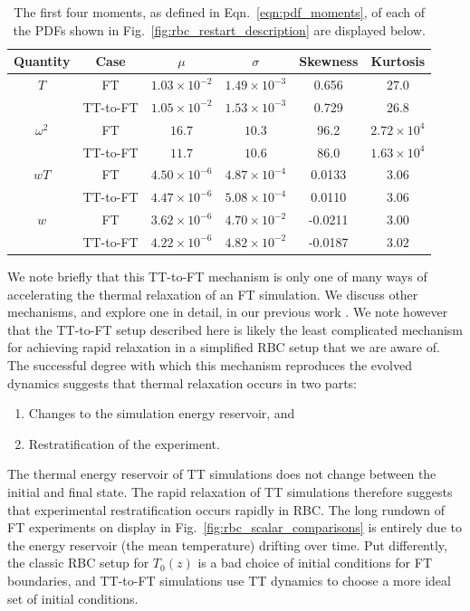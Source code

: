 \begin{table}[b!]
\vspace{-0.5cm}
\caption[PDF moments for FT and TT-to-FT comparisons]{ 
	The first four moments, as defined in Eqn.~\ref{eqn:pdf_moments}, of each of the PDFs shown in Fig.~\ref{fig:rbc_restart_description} are displayed below.
}
\vspace{-0.25cm}
\setlength{\tabcolsep}{12pt}
\label{table:pdf_values}
\begin{center}
\begin{tabular}{c c c c c c}
\hline																	
Quantity &	Case	&	$\mu$	&	$\sigma$	&	Skewness	&	Kurtosis \\
\hline
$T$				&	FT			&		$1.03 \times 10^{-2}$	&	$1.49 \times 10^{-3}$	&	0.656		&	27.0 \\
				&	TT-to-FT	&		$1.05 \times 10^{-2}$	&	$1.53 \times 10^{-3}$	&	0.729		&	26.8 \\
\hline
$\omega^2$		&	FT			&		$16.7$					&	$10.3$					&	96.2		&	$2.72 \times 10^4$ \\
				&	TT-to-FT	&		$11.7$					&	$10.6$					&	86.0		&	$1.63 \times 10^4$ \\
\hline
$wT$			&	FT			&		$4.50 \times 10^{-6}$	&	$4.87 \times 10^{-4}$	&	0.0133	&	$3.06$ \\
				&	TT-to-FT	&		$4.47 \times 10^{-6}$	&	$5.08 \times 10^{-4}$	&	0.0110	&	$3.06$ \\
\hline
$w$				&	FT			&		$3.62 \times 10^{-6}$	&	$4.70 \times 10^{-2}$	&	-0.0211	&	$3.00$ \\
				&	TT-to-FT	&		$4.22 \times 10^{-6}$	&	$4.82 \times 10^{-2}$	&	-0.0187	&	$3.02$ \\
\hline																	
\end{tabular}
\end{center}
\end{table}

We note briefly that this TT-to-FT mechanism is only one of many ways of accelerating the thermal relaxation of an FT simulation.
We discuss other mechanisms, and explore one in detail, in our previous work \citep{anders&all2018}.
We note however that the TT-to-FT setup described here is likely the least complicated mechanism for achieving rapid relaxation in a simplified RBC setup that we are aware of.
The successful degree with which this mechanism reproduces the evolved dynamics suggests that thermal relaxation occurs in two parts:
\begin{enumerate}
\item Changes to the simulation energy reservoir, and
\item Restratification of the experiment.
\end{enumerate}
The thermal energy reservoir of TT simulations does not change between the initial and final state.
The rapid relaxation of TT simulations therefore suggests that experimental restratification occurs rapidly in RBC. 
The long rundown of FT experiments on display in Fig.~\ref{fig:rbc_scalar_comparisons} is entirely due to the energy reservoir (the mean temperature) drifting over time.
Put differently, the classic RBC setup for $T_0(z)$ is a bad choice of initial conditions for FT boundaries, and TT-to-FT simulations use TT dynamics to choose a more ideal set of initial conditions.


